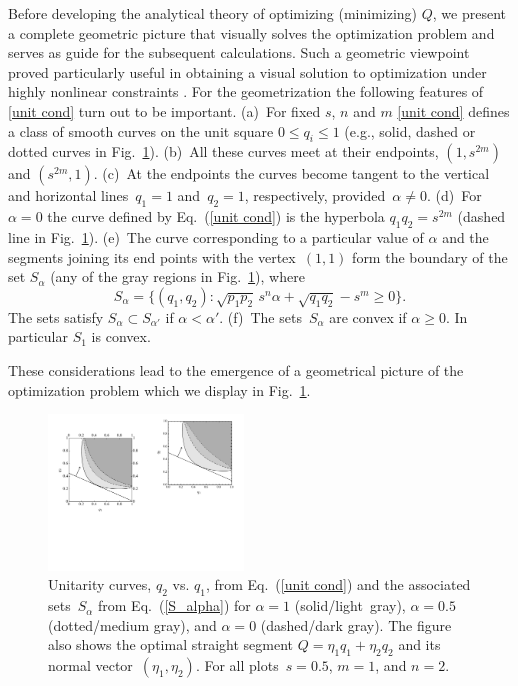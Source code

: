 \documentclass[aps,prl,twocolumn,showpacs]{revtex4}
\begin{document}
Before developing the analytical theory of optimizing (minimizing) $Q$, we present a complete geometric picture that visually solves the optimization problem and serves as guide for the subsequent calculations. Such a geometric viewpoint proved particularly useful in obtaining a visual solution to optimization under highly nonlinear constraints \cite{Bergou1}. For the geometrization the following features of \eqref{unit cond} turn out to be important. (a)~For fixed $s$, $n$ and $m$ \eqref{unit cond} defines a class of smooth curves on the unit square $0\le q_i\le 1$ (e.g., solid, dashed or dotted curves in Fig.~\ref{fig:1}). (b)~All these curves meet at their endpoints, $(1,s^{2m})$ and $(s^{2m},1)$. (c)~At the endpoints  the curves become tangent to the vertical and horizontal lines~$q_1=1$ and~$q_2=1$, respectively, provided~$\alpha\not=0$. %
(d)~For~$\alpha=0$ the curve defined by Eq.~(\ref{unit cond}) is the hyperbola $q_1 q_2=s^{2m}$ (dashed line in Fig.~\ref{fig:1}). (e)~The curve corresponding to a particular value of $\alpha$ and the segments joining its end points with the vertex~$(1,1)$ form the boundary of the set $S_{\alpha}$ (any of the gray regions in Fig.~\ref{fig:1}), where
%
\begin{equation}
S_\alpha=\{ (q_1,q_2): \sqrt{p_1 p_2}\,s^n\alpha+\sqrt{q_1 q_2}-s^m\ge 0\}.
\label{S_alpha}
\end{equation}
%
The sets satisfy $S_{\alpha} \subset S_{\alpha'}$ if $\alpha<\alpha'$.
(f)~The sets~$S_\alpha$ are convex if $\alpha \ge 0$. In particular $S_1$ is convex.

These considerations lead to the emergence of a geometrical picture of the optimization problem which we display in Fig.~\ref{fig:1}.

\begin{figure}[h,t]
\centering
\includegraphics[width=14em]{Fig_1_3rdDraftNC.pdf}
%
\caption{Unitarity curves, $q_{2}$ vs. $q_{1}$, from Eq.~(\ref{unit cond}) and the associated sets~$S_\alpha$ from Eq.~(\ref{S_alpha}) for $\alpha=1$ (solid/light~gray), $\alpha=0.5$ (dotted/medium gray), and $\alpha=0$ (dashed/dark gray). The figure also shows the optimal straight segment \mbox{$Q=\eta_1 q_1+\eta_2 q_2$} and its normal vector~$(\eta_1,\eta_2)$. For all plots~$s = 0.5$, $m = 1$, and $n =2$.}
\label{fig:1}
\end{figure}
\end{document}
